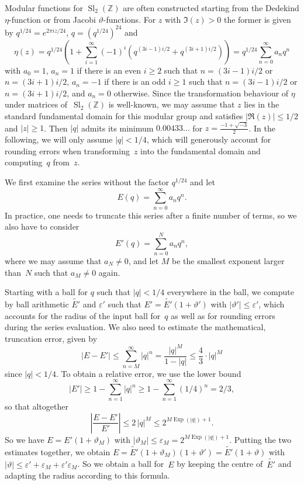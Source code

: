 \documentclass [11pt]{article}
\newcommand {\appro}[1]{\widetilde {#1}}
\DeclareMathOperator{\Exp}{\operatorname {Exp}}
\newcommand {\Z}{\mathbb Z}
\renewcommand {\epsilon}{\varepsilon}
\renewcommand {\theta}{\vartheta}
\renewcommand {\leq}{\leqslant}
\renewcommand {\geq}{\geqslant}
\newcommand {\Sl}{\operatorname{Sl}}
\begin{document}
Modular functions for $\Sl_2 (\Z)$ are often constructed starting from the
Dedekind $\eta$-function or from Jacobi $\theta$-functions. For $z$ with
$\Im (z) > 0$ the former is given by
$q^{1/24} = e^{2 \pi i z / 24}$,
$q = (q^{1/24})^{24}$ and
\[
\eta (z) = q^{1/24} \left( 1 + \sum_{i=1}^\infty (-1)^i
   \left( q^{(3 i - 1) i / 2} + q^{(3 i + 1) i / 2} \right)
\right)
= q^{1/24} \sum_{n=0}^\infty a_n q^n
\]
with $a_0 = 1$,
$a_n = 1$ if there is an even $i \geq 2$ such that
$n = (3 i - 1) i / 2$ or $n = (3 i + 1) i / 2$,
$a_n = -1$ if there is an odd $i \geq 1$ such that
$n = (3 i - 1) i / 2$ or $n = (3 i + 1) i / 2$,
and $a_n = 0$ otherwise.
Since the transformation behaviour of $\eta$ under matrices of~$\Sl_2 (\Z)$
is well-known, we may assume that $z$ lies in the standard fundamental
domain for this modular group and satisfies $|\Re (z)| \leq 1/2$ and
$|z| \geq 1$. Then $|q|$ admits its minimum $0.00433\ldots$ for
$z = \frac {-1 + \sqrt {-3}}{2}$. In the following, we will only assume
$|q| < 1/4$, which will generously account for rounding errors when
transforming~$z$ into the fundamental domain and computing~$q$ from~$z$.

We first examine the series without the factor $q^{1/24}$ and let
\[
E (q) = \sum_{n=0}^\infty a_n q^n.
\]
In practice, one needs to truncate this series after a finite number of
terms, so we also have to consider
\[
E' (q) = \sum_{n=0}^N a_n q^n,
\]
where we may assume that $a_N \neq 0$, and let $M$ be the smallest exponent
larger than~$N$ such that $a_M \neq 0$ again.

Starting with a ball for $q$ such that $|q| < 1/4$ everywhere in the ball,
we compute by ball arithmetic $\appro {E'}$ and $\epsilon'$ such that
$E' = \appro {E'} (1 + \theta')$ with $|\theta'| \leq \epsilon'$, which
accounts for the radius of the input ball for~$q$ as well as for rounding
errors during the series evaluation.
We also need to estimate the mathematical, truncation error, given by
\[
|E - E'|
\leq \sum_{n = M}^\infty |q|^n
= \frac {|q|^M}{1 - |q|}
\leq \frac {4}{3} \cdot |q|^M
\]
since $|q| < 1/4$.
To obtain a relative error, we use the lower bound
\[
|E'|
\geq 1 - \sum_{n=1}^\infty |q|^n
\geq 1 - \sum_{n=1}^\infty (1/4)^n
= 2/3,
\]
so that altogether
\[
\left| \frac {E - E'}{E'} \right|
\leq 2 \, |q|^M
\leq 2^{M \Exp (|q|) + 1}.
\]
So we have $E = E' (1 + \theta_M)$ with
$|\theta_M| \leq \epsilon_M = 2^{M \Exp (|q|) + 1}$.
Putting the two estimates together, we obtain
$E = \appro {E'} (1 + \theta_M) (1 + \theta')
= \appro {E'} (1 + \theta)$
with
$|\theta| \leq \epsilon' + \epsilon_M + \epsilon' \epsilon_M$.
So we obtain a ball for~$E$ by keeping the centre of~$\appro {E'}$
and adapting the radius according to this formula.
\end{document}
